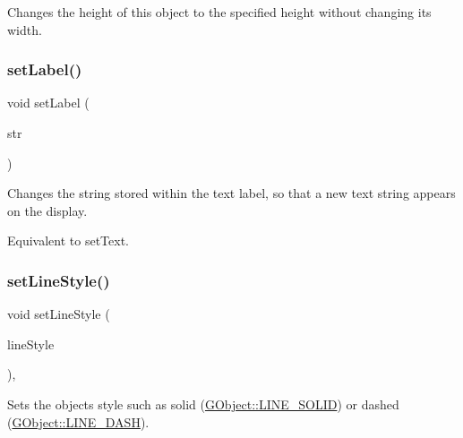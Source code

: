 Changes the height of this object to the specified height without changing its width. 

\mbox{\label{classGText_a889d82f199797fea605ee8230dcd4f6f}} 
\subsubsection{\texorpdfstring{set\+Label()}{setLabel()}}
{\footnotesize\ttfamily void set\+Label (\begin{DoxyParamCaption}\item[{const std\+::string \&}]{str }\end{DoxyParamCaption})\hspace{0.3cm}{\ttfamily [virtual]}}



Changes the string stored within the text label, so that a new text string appears on the display. 

Equivalent to set\+Text. \mbox{\label{classGObject_add11575087eb94f1a71faa3f826c6341}} 
\subsubsection{\texorpdfstring{set\+Line\+Style()}{setLineStyle()}}
{\footnotesize\ttfamily void set\+Line\+Style (\begin{DoxyParamCaption}\item[{\mbox{\hyperlink{classGObject_a86e0f5648542856159bb40775c854aa7}{G\+Object\+::\+Line\+Style}}}]{line\+Style }\end{DoxyParamCaption})\hspace{0.3cm}{\ttfamily [virtual]}, {\ttfamily [inherited]}}



Sets the object\textquotesingle{}s style such as solid (\mbox{\hyperlink{classGObject_a86e0f5648542856159bb40775c854aa7a700c78bc2cd76acaab26651bf7b4941f}{G\+Object\+::\+L\+I\+N\+E\+\_\+\+S\+O\+L\+ID}}) or dashed (\mbox{\hyperlink{classGObject_a86e0f5648542856159bb40775c854aa7a9ccba0845f785d81d07b333ae1aad84e}{G\+Object\+::\+L\+I\+N\+E\+\_\+\+D\+A\+SH}}). 

\mbox{\label{classGObject_afd6a47c6ea6a1f85ca05a65ba3ff3477}} 
